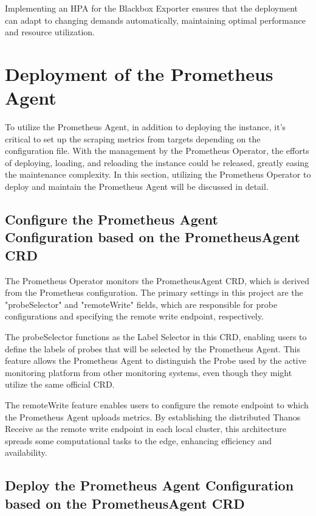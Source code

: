 Implementing an \ac{HPA} for the Blackbox Exporter ensures that the deployment can adapt to changing demands automatically, maintaining optimal performance and resource utilization.

\section{Deployment of the Prometheus Agent}

To utilize the Prometheus Agent, in addition to deploying the instance, it's critical to set up the scraping metrics from targets depending on the configuration file. With the management by the Prometheus Operator, the efforts of deploying, loading, and reloading the instance could be released, greatly easing the maintenance complexity. In this section, utilizing the Prometheus Operator to deploy and maintain the Prometheus Agent will be discussed in detail. 

\subsection{Configure the Prometheus Agent Configuration based on the PrometheusAgent \ac{CRD}}

The Prometheus Operator monitors the PrometheusAgent \ac{CRD}, which is derived from the Prometheus configuration. The primary settings in this project are the "probeSelector" and "remoteWrite" fields, which are responsible for probe configurations and specifying the remote write endpoint, respectively. 

The probeSelector functions as the Label Selector in this \ac{CRD}, enabling users to define the labels of probes that will be selected by the Prometheus Agent. This feature allows the Prometheus Agent to distinguish the Probe used by the active monitoring platform from other monitoring systems, even though they might utilize the same official \ac{CRD}. 

The remoteWrite feature enables users to configure the remote endpoint to which the Prometheus Agent uploads metrics. By establishing the distributed Thanos Receive as the remote write endpoint in each local cluster, this architecture spreads some computational tasks to the edge, enhancing efficiency and availability. 

\subsection{Deploy the Prometheus Agent Configuration based on the PrometheusAgent \ac{CRD}}

